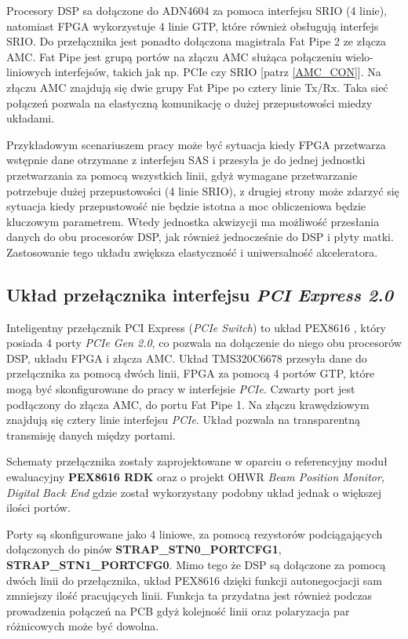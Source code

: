 Procesory DSP sa dołączone do ADN4604 za pomoca interfejsu SRIO (4 linie), natomiast FPGA wykorzystuje 4 linie GTP, które również obsługują interfejs SRIO. Do przełącznika jest ponadto dołączona magistrala Fat Pipe 2 ze złącza AMC. Fat Pipe jest grupą portów na złączu AMC służąca połączeniu wielo-liniowych interfejsów, takich jak np. PCIe czy SRIO [patrz \ref{AMC_CON}]. Na złączu AMC znajdują się dwie grupy Fat Pipe po cztery linie Tx/Rx. Taka sieć połączeń pozwala na elastyczną komunikację o dużej przepustowości miedzy układami. 

Przykładowym scenariuszem pracy może być sytuacja kiedy FPGA przetwarza wstępnie dane otrzymane z interfejsu SAS i przesyła je do jednej jednostki przetwarzania za pomocą wszystkich linii, gdyż wymagane przetwarzanie potrzebuje dużej przepustowości (4 linie SRIO), z drugiej strony może zdarzyć się sytuacja kiedy przepustowość nie będzie istotna a moc obliczeniowa będzie kluczowym parametrem. Wtedy jednostka akwizycji ma możliwość przesłania danych do obu procesorów DSP, jak również jednocześnie do DSP i płyty matki. Zastosowanie tego układu zwiększa elastyczność i uniwersalność akceleratora.


\subsection{Układ przełącznika interfejsu \textit{PCI Express 2.0}}

Inteligentny przełącznik PCI Express (\textit{PCIe Switch}) to układ PEX8616 \cite{PEX8616}, który posiada 4 porty \textit{PCIe Gen 2.0}, co pozwala na dołączenie do niego obu procesorów DSP, układu FPGA i złącza AMC.  Układ TMS320C6678 przesyła dane do przełącznika za pomocą dwóch linii, FPGA za pomocą 4 portów GTP, które mogą być skonfigurowane do pracy w interfejsie \textit{PCIe}. Czwarty port jest podłączony do złącza AMC, do portu Fat Pipe 1. Na złączu krawędziowym znajdują się cztery linie interfejsu \textit{PCIe}. Układ pozwala na transparentną transmisję danych między portami.


Schematy przełącznika zostały zaprojektowane w oparciu o referencyjny moduł ewaluacyjny \textbf{PEX8616 RDK} oraz o projekt OHWR \textit{Beam Position Monitor, Digital Back End} \cite{BPMDBM} gdzie został wykorzystany podobny układ jednak o większej ilości portów.

Porty są skonfigurowane jako 4 liniowe, za pomocą rezystorów podciągających dołączonych do pinów \textbf{STRAP\_STN0\_PORTCFG1}, \textbf{STRAP\_STN1\_PORTCFG0}. Mimo tego że DSP są dołączone za pomocą dwóch linii do przełącznika, układ PEX8616 dzięki funkcji autonegocjacji sam zmniejszy ilość pracujących linii. Funkcja ta przydatna jest również podczas prowadzenia połączeń na PCB gdyż kolejność linii oraz polaryzacja par różnicowych może być dowolna. 

